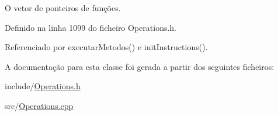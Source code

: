 O vetor de ponteiros de funções. 

Definido na linha 1099 do ficheiro Operations.\+h.



Referenciado por executar\+Metodos() e init\+Instructions().



A documentação para esta classe foi gerada a partir dos seguintes ficheiros\+:\begin{DoxyCompactItemize}
\item 
include/\hyperlink{Operations_8h}{Operations.\+h}\item 
src/\hyperlink{Operations_8cpp}{Operations.\+cpp}\end{DoxyCompactItemize}
